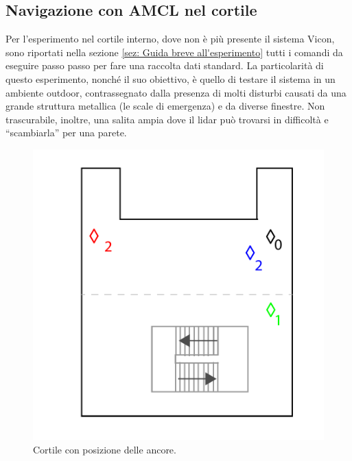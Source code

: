 \FloatBarrier
\subsection{Navigazione con AMCL nel cortile}
Per l'esperimento nel cortile interno, dove non è più presente il sistema Vicon, sono riportati nella sezione \ref{sez: Guida breve all'esperimento} tutti i comandi da eseguire passo passo per fare una raccolta dati standard.
La particolarità di questo esperimento, nonché il suo obiettivo, è quello di testare il sistema in un ambiente outdoor, contrassegnato dalla presenza di molti disturbi causati da una grande struttura metallica (le scale di emergenza) e da diverse finestre. 
Non trascurabile, inoltre, una salita ampia dove il lidar può trovarsi in difficoltà e ``scambiarla'' per una parete.


\begin{figure}
    \centering
    \includegraphics[height=0.3\textheight]{figs/cortile_con_uwb.pdf}
    \caption{Cortile con posizione delle ancore.}
    \label{fig: cortile con uwb}
\end{figure}


